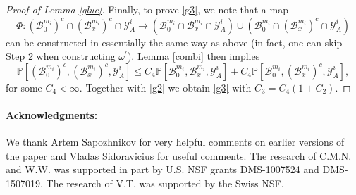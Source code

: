 \documentclass[12pt, twoside,a4paper,reqno]{amsart}
\theoremstyle{plain}
\theoremstyle{remark}
\theoremstyle{definition}
\begin{document}
\begin{proof}[Proof of Lemma \ref{glue}]
Finally, to prove \eqref{g3}, we note that a map
\begin{equation*}
\Phi :\left( \mathcal{B}_{0}^{m_{i}}\right) ^{c}\cap \left( \mathcal{B}%
_{x}^{m_{i}}\right) ^{c}\cap \mathcal{Y}_{A}^{i}\rightarrow \left( \mathcal{B%
}_{0}^{m_{i}}\cap \mathcal{B}_{x}^{m_{i}}\cap \mathcal{Y}_{A}^{i}\right)
\cup \left( \mathcal{B}_{0}^{m_{i}}\cap \left( \mathcal{B}%
_{x}^{m_{i}}\right) ^{c}\cap \mathcal{Y}_{A}^{i}\right)
\end{equation*}%
can be constructed in essentially the same way as above (in fact, one can skip Step 2 when constructing $\omega ^{\prime }$). Lemma \ref{combi} then
implies%
\begin{equation*}
\mathbb{P}\left[ \left( \mathcal{B}_{0}^{m_{i}}\right) ^{c},\left( \mathcal{B%
}_{x}^{m_{i}}\right) ^{c},\mathcal{Y}_{A}^{i}\right] \leq C_{4}\mathbb{P}%
\left[ \mathcal{B}_{0}^{m_{i}},\mathcal{B}_{x}^{m_{i}},\mathcal{Y}_{A}^{i}%
\right] +C_{4}\mathbb{P}\left[ \mathcal{B}_{0}^{m_{i}},\left( \mathcal{B}%
_{x}^{m_{i}}\right) ^{c},\mathcal{Y}_{A}^{i}\right] ,
\end{equation*}%
for some $C_{4}<\infty $. Together with \eqref{g2} we obtain \eqref{g3} with $C_{3}= C_{4}(1+C_{2})$.
\end{proof}

\bigskip
\paragraph{\textbf{Acknowledgments:}} We thank Artem Sapozhnikov for very helpful
comments on earlier versions of the paper and Vladas Sidoravicius for useful
comments. The research of C.M.N. and W.W. was supported in part by U.S. NSF
grants DMS-1007524 and DMS-1507019. The research of V.T. was supported by the
Swiss NSF.



\end{document}
